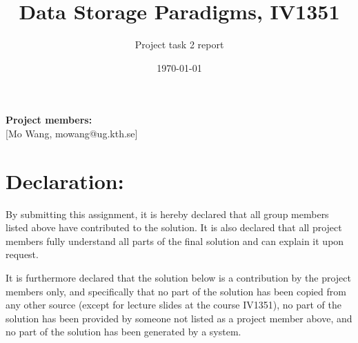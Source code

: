 \documentclass[a4paper]{scrartcl}
\title{Data Storage Paradigms, IV1351}
\subtitle{Project task 2 report}
\author{}
\date{\today}
\renewcommand{\_}{\textunderscore\allowbreak}
\begin{document}
\maketitle
\noindent\textbf{Project members:} \\ \hfill
[Mo Wang, mowang@ug.kth.se] \\ \hfill

\section*{Declaration:}

By submitting this assignment, it is hereby declared that all group members listed above have contributed to the solution. It is also declared that all project members fully understand all parts of the final solution and can explain it upon request.

It is furthermore declared that the solution below is a contribution by the project members only, and specifically that no part of the solution has been copied from any other source (except for lecture slides at the course IV1351), no part of the solution has been provided by someone not listed as a project member above, and no part of the solution has been generated by a system.




\end{document}
